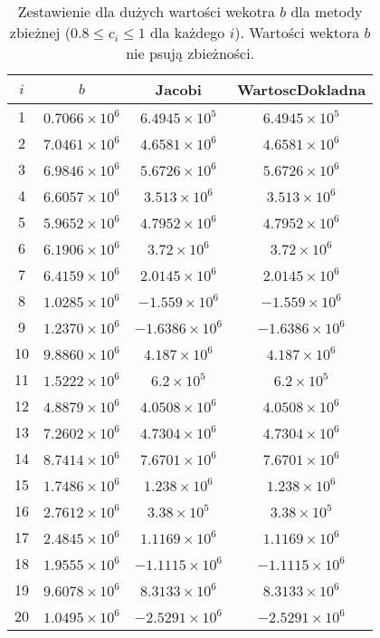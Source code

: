 \documentclass{article}
\begin{document}
	\begin{table}[h]
		\centering
		\begin{tabular}{|c|c|c|c|}
			\hline
			$i$ & $b$ & Jacobi & WartoscDokladna \\
			\hline
			1 & $0.7066 \times 10^6$ & $6.4945 \times 10^5$ & $6.4945 \times 10^5$ \\
			2 & $7.0461 \times 10^6$ & $4.6581 \times 10^6$ & $4.6581 \times 10^6$ \\
			3 & $6.9846 \times 10^6$ & $5.6726 \times 10^6$ & $5.6726 \times 10^6$ \\
			4 & $6.6057 \times 10^6$ & $3.513 \times 10^6$ & $3.513 \times 10^6$ \\
			5 & $5.9652 \times 10^6$ & $4.7952 \times 10^6$ & $4.7952 \times 10^6$ \\
			6 & $6.1906 \times 10^6$ & $3.72 \times 10^6$ & $3.72 \times 10^6$ \\
			7 & $6.4159 \times 10^6$ & $2.0145 \times 10^6$ & $2.0145 \times 10^6$ \\
			8 & $1.0285 \times 10^6$ & $-1.559 \times 10^6$ & $-1.559 \times 10^6$ \\
			9 & $1.2370 \times 10^6$ & $-1.6386 \times 10^6$ & $-1.6386 \times 10^6$ \\
			10 & $9.8860 \times 10^6$ & $4.187 \times 10^6$ & $4.187 \times 10^6$ \\
			11 & $1.5222 \times 10^6$ & $6.2 \times 10^5$ & $6.2 \times 10^5$ \\
			12 & $4.8879 \times 10^6$ & $4.0508 \times 10^6$ & $4.0508 \times 10^6$ \\
			13 & $7.2602 \times 10^6$ & $4.7304 \times 10^6$ & $4.7304 \times 10^6$ \\
			14 & $8.7414 \times 10^6$ & $7.6701 \times 10^6$ & $7.6701 \times 10^6$ \\
			15 & $1.7486 \times 10^6$ & $1.238 \times 10^6$ & $1.238 \times 10^6$ \\
			16 & $2.7612 \times 10^6$ & $3.38 \times 10^5$ & $3.38 \times 10^5$ \\
			17 & $2.4845 \times 10^6$ & $1.1169 \times 10^6$ & $1.1169 \times 10^6$ \\
			18 & $1.9555 \times 10^6$ & $-1.1115 \times 10^6$ & $-1.1115 \times 10^6$ \\
			19 & $9.6078 \times 10^6$ & $8.3133 \times 10^6$ & $8.3133 \times 10^6$ \\
			20 & $1.0495 \times 10^6$ & $-2.5291 \times 10^6$ & $-2.5291 \times 10^6$ \\
			\hline
		\end{tabular}
		\caption{Zestawienie dla dużych wartości wekotra $b$ dla metody zbieżnej ($0.8 \le c_i \le 1$ dla każdego $i$). Wartości wektora $b$ nie psują zbieżności.}
	\end{table}
\end{document}
